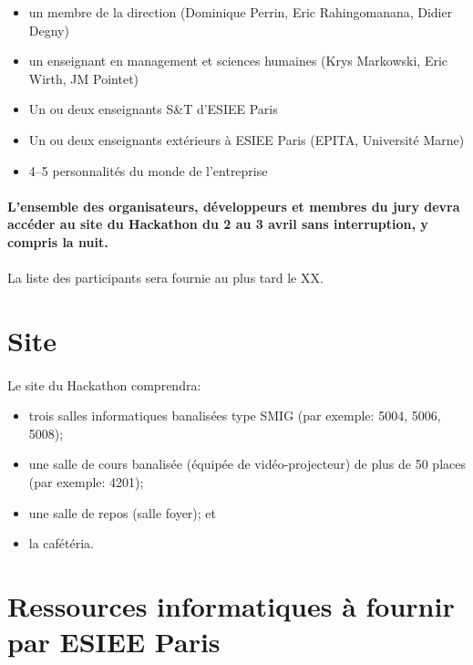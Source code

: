 \documentclass{article}
\begin{document}
\begin{itemize}
  \item un membre de la direction (Dominique Perrin, Eric Rahingomanana, Didier
	  Degny)
  \item un enseignant en management et sciences humaines (Krys Markowski, Eric
	  Wirth, JM Pointet)
  \item Un ou deux enseignants S\&T d'ESIEE Paris
  \item Un ou deux enseignants extérieurs à ESIEE Paris (EPITA, Université
	  Marne)
  \item 4--5 personnalités du monde de l'entreprise
\end{itemize}

\paragraph{}
\textbf{L'ensemble des organisateurs, développeurs et membres du jury devra
	accéder au site du Hackathon du 2 au 3 avril sans interruption, y compris
	la nuit.}

\paragraph{}
La liste des participants sera fournie au plus tard le XX.

\section{Site}

\paragraph{}
Le site du Hackathon comprendra:

\begin{itemize}
  \item trois salles informatiques banalisées type SMIG (par exemple: 5004,
	  5006, 5008);
  \item une salle de cours banalisée (équipée de vidéo-projecteur) de plus de
	  50 places (par exemple: 4201);
  \item une salle de repos (salle foyer); et
  \item la cafétéria.
\end{itemize}

\section{Ressources informatiques à fournir par ESIEE Paris}
\end{document}

